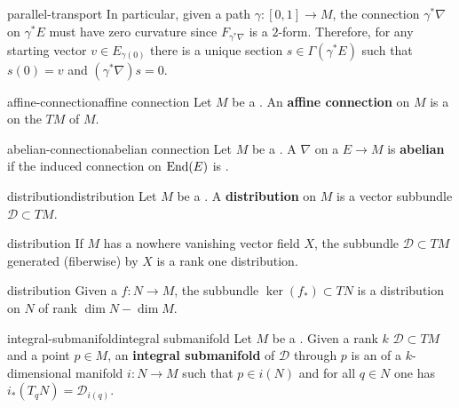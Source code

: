 \begin{example}{parallel-transport}
    In particular, given a path $\gamma : [0, 1] \to M$, the connection $\gamma^* \nabla$ on $\gamma^* E$ must have zero curvature since $F_{\gamma^* \nabla}$ is a $2$-form. Therefore, for any starting vector $v \in E_{\gamma(0)}$ there is a unique section $s \in \Gamma(\gamma^* E)$ such that $s(0) = v$ and $(\gamma^* \nabla) s = 0$.
\end{example}

\begin{topic}{affine-connection}{affine connection}
    Let $M$ be a . An \textbf{affine connection} on $M$ is a  on the  $TM$ of $M$.
\end{topic}

\begin{topic}{abelian-connection}{abelian connection}
    Let $M$ be a . A  $\nabla$ on a  $E \to M$ is \textbf{abelian} if the induced connection on $\textup{End}(E)$ is .
\end{topic}

\begin{topic}{distribution}{distribution}
    Let $M$ be a . A \textbf{distribution} on $M$ is a vector subbundle $\mathcal{D} \subset TM$.
\end{topic}

\begin{example}{distribution}
    If $M$ has a nowhere vanishing vector field $X$, the subbundle $\mathcal{D} \subset TM$ generated (fiberwise) by $X$ is a rank one distribution.
\end{example}

\begin{example}{distribution}
    Given a  $f : N \to M$, the subbundle $\ker(f_*) \subset TN$ is a distribution on $N$ of rank $\dim N - \dim M$.
\end{example}

\begin{topic}{integral-submanifold}{integral submanifold}
    Let $M$ be a . Given a rank $k$  $\mathcal{D} \subset TM$ and a point $p \in M$, an \textbf{integral submanifold} of $\mathcal{D}$ through $p$ is an  of a $k$-dimensional manifold $i : N \to M$ such that $p \in i(N)$ and for all $q \in N$ one has $i_*(T_q N) = \mathcal{D}_{i(q)}$.
\end{topic}

